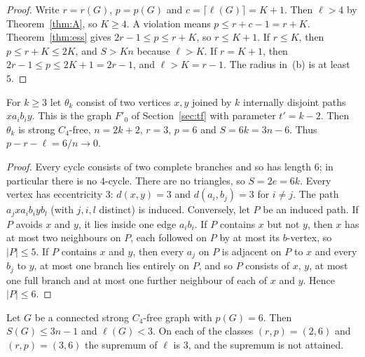 \documentclass[ASNA]{USG}
\theoremstyle{WBstyletwo}
\numberwithin{equation}{section}
\newcommand{\lr}{\ell}
\newcommand{\pp}{p}
\begin{document}
\begin{proof}
Write $r=r(G)$, $\pp=\pp(G)$ and $c=\lceil\lr(G)\rceil=K+1$. Then $\lr>4$ by Theorem~\ref{thm:A}, so $K\ge 4$. A violation means $\pp\le r+c-1=r+K$. Theorem~\ref{thm:ess} gives $2r-1\le\pp\le r+K$, so $r\le K+1$. If $r\le K$, then $\pp\le r+K\le 2K$, and $S>Kn$ because $\lr>K$. If $r=K+1$, then $2r-1\le\pp\le 2K+1=2r-1$, and $\lr>K=r-1$. The radius in~(b) is at least~$5$.
\end{proof}

\begin{proposition}\label{prop:theta}
For $k\ge 3$ let $\theta_k$ consist of two vertices $x,y$ joined by $k$ internally disjoint paths $xa_ib_iy$. This is the graph $F'_0$ of Section~\ref{sec:tf} with parameter $t'=k-2$. Then $\theta_k$ is strong $C_4$-free, $n=2k+2$, $r=3$, $\pp=6$ and $S=6k=3n-6$. Thus $\pp-r-\lr=6/n\to 0$.
\end{proposition}

\begin{proof}
Every cycle consists of two complete branches and so has length $6$; in particular there is no $4$-cycle. There are no triangles, so $S=2e=6k$. Every vertex has eccentricity $3$: $d(x,y)=3$ and $d(a_i,b_j)=3$ for $i\ne j$. The path $a_jxa_ib_iyb_l$ (with $j,i,l$ distinct) is induced. Conversely, let $P$ be an induced path. If $P$ avoids $x$ and $y$, it lies inside one edge $a_ib_i$. If $P$ contains $x$ but not $y$, then $x$ has at most two neighbours on $P$, each followed on $P$ by at most its $b$-vertex, so $|P|\le 5$. If $P$ contains $x$ and $y$, then every $a_j$ on $P$ is adjacent on $P$ to $x$ and every $b_j$ to $y$, at most one branch lies entirely on $P$, and so $P$ consists of $x$, $y$, at most one full branch and at most one further neighbour of each of $x$ and $y$. Hence $|P|\le 6$.
\end{proof}


\begin{corollary}\label{cor:sharp}
Let $G$ be a connected strong $C_4$-free graph with $\pp(G)=6$. Then $S(G)\le 3n-1$ and $\lr(G)<3$. On each of the classes $(r,\pp)=(2,6)$ and $(r,\pp)=(3,6)$ the supremum of $\lr$ is $3$, and the supremum is not attained.
\end{corollary}
\end{document}
